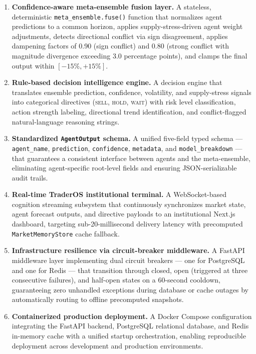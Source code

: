 \documentclass[12pt,a4paper]{report}
\begin{document}
\begin{enumerate}
    \item \textbf{Confidence-aware meta-ensemble fusion layer.} A stateless, deterministic \texttt{meta\_ensemble.fuse()} function that normalizes agent predictions to a common horizon, applies supply-stress-driven agent weight adjustments, detects directional conflict via sign disagreement, applies dampening factors of 0.90 (sign conflict) and 0.80 (strong conflict with magnitude divergence exceeding 3.0 percentage points), and clamps the final output within $[-15\%, +15\%]$.

    \item \textbf{Rule-based decision intelligence engine.} A decision engine that translates ensemble prediction, confidence, volatility, and supply-stress signals into categorical directives (\textsc{sell}, \textsc{hold}, \textsc{wait}) with risk level classification, action strength labeling, directional trend identification, and conflict-flagged natural-language reasoning strings.

    \item \textbf{Standardized \texttt{AgentOutput} schema.} A unified five-field typed schema — \texttt{agent\_name}, \texttt{prediction}, \texttt{confidence}, \texttt{metadata}, and \texttt{model\_breakdown} — that guarantees a consistent interface between agents and the meta-ensemble, eliminating agent-specific root-level fields and ensuring JSON-serializable audit trails.

    \item \textbf{Real-time TraderOS institutional terminal.} A WebSocket-based cognition streaming subsystem that continuously synchronizes market state, agent forecast outputs, and directive payloads to an institutional Next.js dashboard, targeting sub-20-millisecond delivery latency with precomputed \texttt{MarketMemoryStore} cache fallback.

    \item \textbf{Infrastructure resilience via circuit-breaker middleware.} A FastAPI middleware layer implementing dual circuit breakers — one for PostgreSQL and one for Redis — that transition through closed, open (triggered at three consecutive failures), and half-open states on a 60-second cooldown, guaranteeing zero unhandled exceptions during database or cache outages by automatically routing to offline precomputed snapshots.

    \item \textbf{Containerized production deployment.} A Docker Compose configuration integrating the FastAPI backend, PostgreSQL relational database, and Redis in-memory cache with a unified startup orchestration, enabling reproducible deployment across development and production environments.

\end{enumerate}
\end{document}
